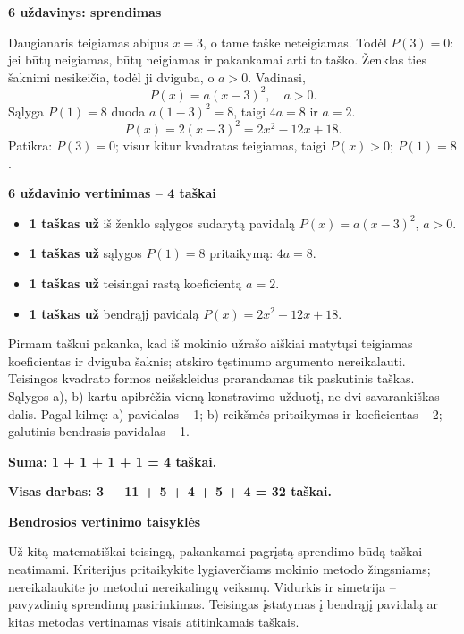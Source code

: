 \documentclass[11pt]{article}
\newcommand{\sk}[1]{\par\medskip\textbf{#1}\par}
\begin{document}
\sk{6 uždavinys: sprendimas}
Daugianaris teigiamas abipus $x=3$, o tame taške neteigiamas. Todėl $P(3)=0$: jei būtų neigiamas, būtų neigiamas ir pakankamai arti to taško. Ženklas ties šaknimi nesikeičia, todėl ji dviguba, o $a>0$. Vadinasi,
\[P(x)=a(x-3)^2,\quad a>0.\]
Sąlyga $P(1)=8$ duoda $a(1-3)^2=8$, taigi $4a=8$ ir $a=2$.
\[\boxed{P(x)=2(x-3)^2=2 x^{2} - 12 x + 18.}\]
Patikra: $P(3)=0$; visur kitur kvadratas teigiamas, taigi $P(x)>0$; $P(1)=8$.

\sk{6 uždavinio vertinimas -- 4 taškai}
\begin{itemize}
\item \textbf{1 taškas už} iš ženklo sąlygos sudarytą pavidalą $P(x)=a(x-3)^2$, $a>0$.
\item \textbf{1 taškas už} sąlygos $P(1)=8$ pritaikymą: $4a=8$.
\item \textbf{1 taškas už} teisingai rastą koeficientą $a=2$.
\item \textbf{1 taškas už} bendrąjį pavidalą $P(x)=2 x^{2} - 12 x + 18$.
\end{itemize}
Pirmam taškui pakanka, kad iš mokinio užrašo aiškiai matytųsi teigiamas koeficientas ir dviguba šaknis; atskiro tęstinumo argumento nereikalauti. Teisingos kvadrato formos neišskleidus prarandamas tik paskutinis taškas. Sąlygos a), b) kartu apibrėžia vieną konstravimo užduotį, ne dvi savarankiškas dalis. Pagal kilmę: a) pavidalas -- 1; b) reikšmės pritaikymas ir koeficientas -- 2; galutinis bendrasis pavidalas -- 1.\par\textbf{Suma: 1 + 1 + 1 + 1 = 4 taškai.}\par\textbf{Visas darbas: 3 + 11 + 5 + 4 + 5 + 4 = 32 taškai.}\newpage
\sk{Bendrosios vertinimo taisyklės}
Už kitą matematiškai teisingą, pakankamai pagrįstą sprendimo būdą taškai neatimami. Kriterijus pritaikykite lygiaverčiams mokinio metodo žingsniams; nereikalaukite jo metodui nereikalingų veiksmų. Vidurkis ir simetrija -- pavyzdinių sprendimų pasirinkimas. Teisingas įstatymas į bendrąjį pavidalą ar kitas metodas vertinamas visais atitinkamais taškais.
\end{document}

